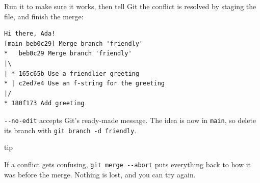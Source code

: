 \begin{codeblock}

\begin{Shaded}
\begin{Highlighting}[]
     \SpecialCharTok{\{}\SpecialCharTok{\}}


\NormalTok{))}
\end{Highlighting}
\end{Shaded}

\end{codeblock}


Run it to make sure it works, then tell Git the conflict is resolved by staging the file, and finish the merge:

\begin{codeblock}

\begin{Shaded}
\begin{Highlighting}[]
 
\end{Highlighting}
\end{Shaded}

\end{codeblock}

\begin{codeblock}
\begin{Verbatim}[formatcom=\outputstyle]
Hi there, Ada!
[main beb0c29] Merge branch 'friendly'
*   beb0c29 Merge branch 'friendly'
|\  
| * 165c65b Use a friendlier greeting
* | c2ed7e4 Use an f-string for the greeting
|/  
* 180f173 Add greeting
\end{Verbatim}
\end{codeblock}

\texttt{-\/-no-edit} accepts Git's ready-made message. The idea is now in \texttt{main}, so delete its branch with \texttt{git\ branch\ -d\ friendly}.

\begin{callout}{tip}

If a conflict gets confusing, \texttt{git\ merge\ -\/-abort} puts everything back to how it was before the merge. Nothing is lost, and you can try again.

\end{callout}

